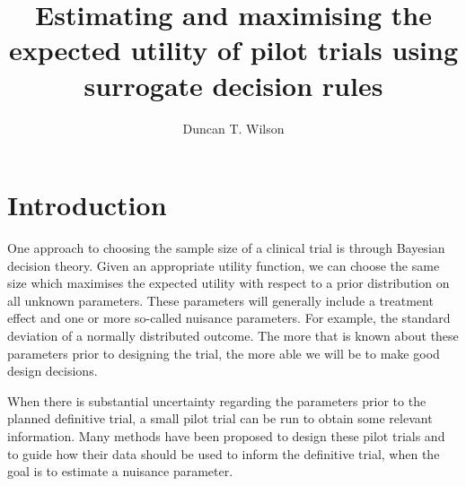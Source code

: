 \documentclass[sagev, Crown]{sagej} %
\begin{document}

\title{Estimating and maximising the expected utility of pilot trials using surrogate decision rules}

\author{Duncan T. Wilson}%



\begin{abstract}

\end{abstract}


\maketitle

\section{Introduction}

One approach to choosing the sample size of a clinical trial is through Bayesian decision theory. Given an appropriate utility function, we can choose the same size which maximises the expected utility with respect to a prior distribution on all unknown parameters. These parameters will generally include a treatment effect and one or more so-called nuisance parameters. For example, the standard deviation of a normally distributed outcome. The more that is known about these parameters prior to designing the trial, the more able we will be to make good design decisions.

When there is substantial uncertainty regarding the parameters prior to the planned definitive trial, a small pilot trial can be run to obtain some relevant information. Many methods have been proposed to design these pilot trials and to guide how their data should be used to inform the definitive trial, when the goal is to estimate a nuisance parameter.
\cite{Teare2014}
\cite{Julious2006}
\cite{Whitehead2015}
\cite{Eldridge2015}
\cite{Lake2002}
\cite{Grayling2018}
\cite{Proschan2005}
\cite{Schie2014}
\cite{Wittes1990}
\end{document}
